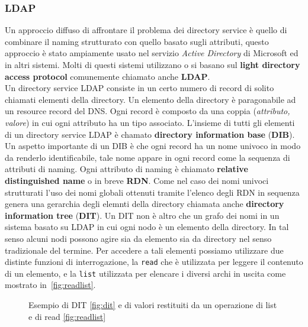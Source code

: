 \subsubsection{LDAP}
Un approccio diffuso di affrontare il problema dei directory service è quello di combinare il naming strutturato con quello basato sugli attributi, questo approccio è stato ampiamente usato nel servizio \emph{Active Directory} di Microsoft ed in altri sistemi. Molti di questi sistemi utilizzano o si basano sul \textbf{light directory access protocol} comunemente chiamato anche \textbf{LDAP}.\\
Un directory service LDAP consiste in un certo numero di record di solito chiamati elementi della directory. Un elemento della directory è paragonabile ad un resource record del DNS. Ogni record è composto da una coppia (\emph{attributo, valore}) in cui ogni attributo ha un tipo associato. L'insieme di tutti gli elementi di un directory service LDAP è chamato \textbf{directory information base} (\textbf{DIB}). Un aspetto importante di un DIB è che ogni record ha un nome univoco in modo da renderlo identificabile, tale nome appare in ogni record come la sequenza di attributi di naming. Ogni attributo di naming è chiamato \textbf{relative distinguished name} o in breve \textbf{RDN}. Come nel caso dei nomi univoci strutturati l'uso dei nomi globali ottenuti tramite l'elenco degli RDN in sequenza genera una gerarchia degli elemnti della directory chiamata anche \textbf{directory information tree} (\textbf{DIT}). Un DIT non è altro che un grafo dei nomi in un sistema basato su LDAP in cui ogni nodo è un elemento della directory. In tal senso alcuni nodi possono agire sia da elemento sia da directory nel senso tradizionale del termine. Per accedere a tali elementi possiamo utilizzare due distinte  funzioni di interrogazione, la \texttt{read} che è utilizzata per leggere il contenuto di un elemento, e la \texttt{list} utilizzata per elencare i diversi archi in uscita come mostrato in \figurename\,\ref{fig:readlist}.
\begin{figure}[hbt]
\caption{Esempio di DIT \ref{fig:dit} e di valori restituiti da un operazione di list e di read \ref{fig:readlist}}
\end{figure}
